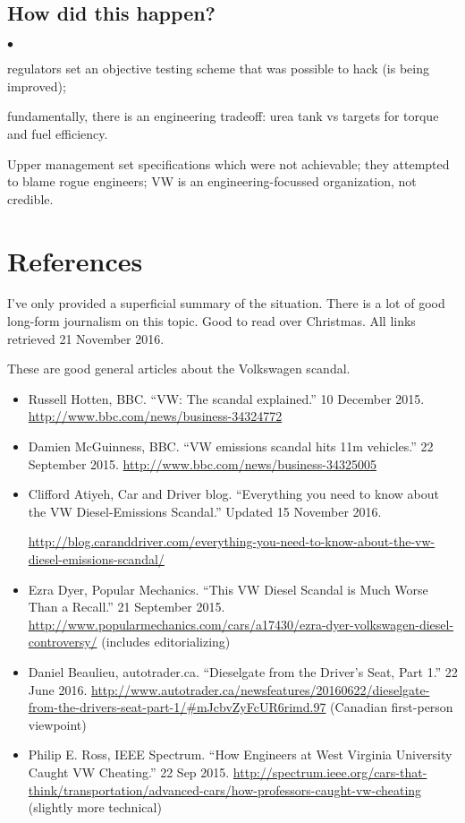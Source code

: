 \documentclass[11pt]{article}
\newcommand{\squishlist}{
 \begin{list}{$\bullet$}
  { \setlength{\itemsep}{0pt}
     \setlength{\parsep}{3pt}
     \setlength{\topsep}{3pt}
     \setlength{\partopsep}{0pt}
     \setlength{\leftmargin}{1.5em}
     \setlength{\labelwidth}{1em}
     \setlength{\labelsep}{0.5em} } }
\newcommand{\squishend}{
  \end{list}  }
\begin{document}
\subsection*{How did this happen?}
\squishlist
\item regulators set an objective testing scheme that was possible to hack (is being improved);
\item fundamentally, there is an engineering tradeoff: urea tank vs targets for torque and fuel efficiency.
\item Upper management set specifications which were not achievable; they attempted to blame rogue engineers; VW is an engineering-focussed organization, not credible.
\squishend

\newpage
\section*{References}

I've only provided a superficial summary of the situation. There is a
lot of good long-form journalism on this topic. Good to read over Christmas.
All links retrieved 21 November 2016.

\noindent
These are good general articles about the Volkswagen scandal.

\begin{itemize}
\item Russell Hotten, BBC. ``VW: The scandal explained.'' 10 December 2015. \url{http://www.bbc.com/news/business-34324772}
\item Damien McGuinness, BBC. ``VW emissions scandal hits 11m vehicles.'' 22 September 2015. \url{http://www.bbc.com/news/business-34325005}
\item Clifford Atiyeh, Car and Driver blog. ``Everything you need to know about the VW Diesel-Emissions Scandal.'' Updated 15 November 2016. 

\url{http://blog.caranddriver.com/everything-you-need-to-know-about-the-vw-diesel-emissions-scandal/}
\item Ezra Dyer, Popular Mechanics. ``This VW Diesel Scandal is Much Worse Than a Recall.'' 21 September 2015. \url{http://www.popularmechanics.com/cars/a17430/ezra-dyer-volkswagen-diesel-controversy/} (includes editorializing)
\item Daniel Beaulieu, autotrader.ca. ``Dieselgate from the Driver's Seat, Part 1.'' 22 June 2016. \url{http://www.autotrader.ca/newsfeatures/20160622/dieselgate-from-the-drivers-seat-part-1/#mJcbvZyFcUR6rimd.97} (Canadian first-person viewpoint)
\item Philip E. Ross, IEEE Spectrum. ``How Engineers at West Virginia University Caught VW Cheating.'' 22 Sep 2015. \url{http://spectrum.ieee.org/cars-that-think/transportation/advanced-cars/how-professors-caught-vw-cheating} (slightly more technical)
\end{itemize}
\end{document}
